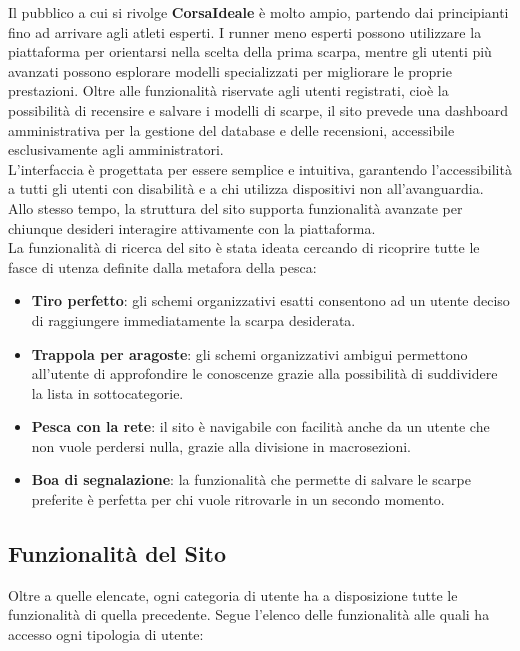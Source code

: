 \documentclass[a4paper, 12pt]{article}
\begin{document}
\begin{justify}
Il pubblico a cui si rivolge \textbf{CorsaIdeale} è molto ampio, partendo dai principianti fino ad arrivare agli atleti esperti. I runner meno esperti possono utilizzare la piattaforma per orientarsi nella scelta della prima scarpa, mentre gli utenti più avanzati possono esplorare modelli specializzati per migliorare le proprie prestazioni. Oltre alle funzionalità riservate agli utenti registrati, cioè la possibilità di recensire e salvare i modelli di scarpe, il sito prevede una dashboard amministrativa per la gestione del database e delle recensioni, accessibile esclusivamente agli amministratori.\\
L'interfaccia è progettata per essere semplice e intuitiva, garantendo l'accessibilità a tutti gli utenti con disabilità e a chi utilizza dispositivi non all'avanguardia. Allo stesso tempo, la struttura del sito supporta funzionalità avanzate per chiunque desideri interagire attivamente con la piattaforma.\\
La funzionalità di ricerca del sito è stata ideata cercando di ricoprire tutte le fasce di utenza definite dalla metafora della pesca:
\begin{itemize}
    \item \textbf{Tiro perfetto}: gli schemi organizzativi esatti consentono ad un utente deciso di raggiungere immediatamente la scarpa desiderata.
    \item \textbf{Trappola per aragoste}: gli schemi organizzativi ambigui permettono all'utente di approfondire le conoscenze grazie alla possibilità di suddividere la lista in sottocategorie.
    \item \textbf{Pesca con la rete}: il sito è navigabile con facilità anche da un utente che non vuole perdersi nulla, grazie alla divisione in macrosezioni.
    \item \textbf{Boa di segnalazione}: la funzionalità che permette di salvare le scarpe preferite è perfetta per chi vuole ritrovarle in un secondo momento.
\end{itemize}

\subsection{Funzionalità del Sito}

Oltre a quelle elencate, ogni categoria di utente ha a disposizione tutte le funzionalità di quella precedente. Segue l'elenco delle funzionalità alle quali ha accesso ogni tipologia di utente:


\end{justify}
\end{document}
